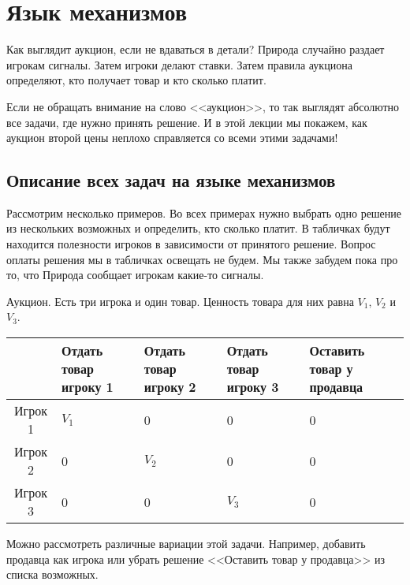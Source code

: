 \chapter{Язык механизмов}
Как выглядит аукцион, если не вдаваться в детали? Природа случайно раздает игрокам сигналы. Затем игроки делают ставки. Затем правила аукциона определяют, кто получает товар и кто сколько платит. 

Если не обращать внимание на слово <<аукцион>>, то так выглядят абсолютно все задачи, где нужно принять решение. И в этой лекции мы покажем, как аукцион второй цены неплохо справляется со всеми этими задачами!





\section{Описание всех задач на языке механизмов}

Рассмотрим несколько примеров. Во всех примерах нужно выбрать одно решение из нескольких возможных и определить, кто сколько платит. В табличках будут находится полезности игроков в зависимости от принятого решение. Вопрос оплаты решения мы в табличках освещать не будем. Мы также забудем пока про то, что Природа сообщает игрокам какие-то сигналы.


\begin{myex} Аукцион. Есть три игрока и один товар. Ценность товара для них равна $ V_{1} $, $ V_{2} $ и $ V_{3} $.

\begin{tabular}{c|p{3 cm}p{3 cm}p{3 cm}p{3 cm}}
& Отдать товар игроку 1 & Отдать товар игроку 2 & Отдать товар игроку 3 & Оставить товар у продавца \\ 
\hline 
Игрок 1 & $ V_{1} $ & 0 & 0 & 0\\ 
Игрок 2 & 0 & $ V_{2} $ & 0 & 0\\ 
Игрок 3 & 0 & 0 & $ V_{3} $ & 0\\ 
\end{tabular} 

Можно рассмотреть различные вариации этой задачи. Например, добавить продавца как игрока или убрать решение <<Оставить товар у продавца>> из списка возможных.

\end{myex}


